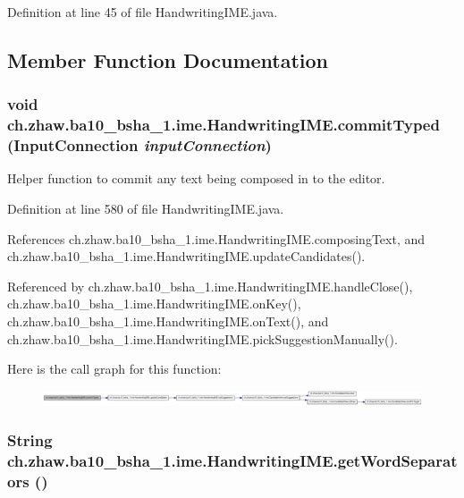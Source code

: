 Definition at line 45 of file HandwritingIME.java.

\subsection{Member Function Documentation}
\hypertarget{classch_1_1zhaw_1_1ba10__bsha__1_1_1ime_1_1HandwritingIME_a3f0ca3d6a23ac27b9ad1b2578078512e}{
\subsubsection[{commitTyped}]{\setlength{\rightskip}{0pt plus 5cm}void ch.zhaw.ba10\_\-bsha\_\-1.ime.HandwritingIME.commitTyped (InputConnection {\em inputConnection})}}
\label{classch_1_1zhaw_1_1ba10__bsha__1_1_1ime_1_1HandwritingIME_a3f0ca3d6a23ac27b9ad1b2578078512e}
Helper function to commit any text being composed in to the editor. 

Definition at line 580 of file HandwritingIME.java.

References ch.zhaw.ba10\_\-bsha\_\-1.ime.HandwritingIME.composingText, and ch.zhaw.ba10\_\-bsha\_\-1.ime.HandwritingIME.updateCandidates().

Referenced by ch.zhaw.ba10\_\-bsha\_\-1.ime.HandwritingIME.handleClose(), ch.zhaw.ba10\_\-bsha\_\-1.ime.HandwritingIME.onKey(), ch.zhaw.ba10\_\-bsha\_\-1.ime.HandwritingIME.onText(), and ch.zhaw.ba10\_\-bsha\_\-1.ime.HandwritingIME.pickSuggestionManually().

Here is the call graph for this function:\nopagebreak
\begin{figure}[H]
\begin{center}
\leavevmode
\includegraphics[width=420pt]{classch_1_1zhaw_1_1ba10__bsha__1_1_1ime_1_1HandwritingIME_a3f0ca3d6a23ac27b9ad1b2578078512e_cgraph}
\end{center}
\end{figure}
\hypertarget{classch_1_1zhaw_1_1ba10__bsha__1_1_1ime_1_1HandwritingIME_aedc68ffb6a0f14256976a0cfdb5a8a3d}{
\subsubsection[{getWordSeparators}]{\setlength{\rightskip}{0pt plus 5cm}String ch.zhaw.ba10\_\-bsha\_\-1.ime.HandwritingIME.getWordSeparators ()}}
\label{classch_1_1zhaw_1_1ba10__bsha__1_1_1ime_1_1HandwritingIME_aedc68ffb6a0f14256976a0cfdb5a8a3d}


